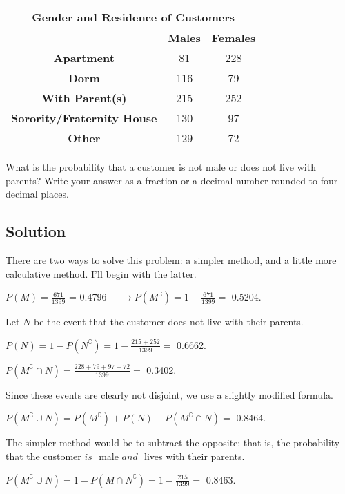 \documentclass[]{article}
\begin{document}
\begin{center}
\begin{tabular}{ | c | c | c | }
 \hline
 \multicolumn{3}{|c|}{\textbf{Gender and Residence of Customers}} \\
 \hline
  & \textbf{Males} & \textbf{Females}\\
 \hline
 \textbf{Apartment} & 81 & 228\\
 \hline
 \textbf{Dorm} & 116 & 79\\
 \hline
 \textbf{With Parent(s)} & 215 & 252\\
 \hline
 \textbf{Sorority/Fraternity House} & 130 & 97\\
 \hline
 \textbf{Other} & 129 & 72\\
 \hline
\end{tabular}
\end{center}

What is the probability that a customer is not male or does not live
with parents? Write your answer as a fraction or a decimal number
rounded to four decimal places.

\subsection{Solution}\label{solution-2}

There are two ways to solve this problem: a simpler method, and a little
more calculative method. I'll begin with the latter.

\(P(M) = \frac{671}{1399}\) = 0.4796
~~\(\to P(M^{\complement}) = 1 - \frac{671}{1399} =\) 0.5204.

Let \(N\) be the event that the customer does not live with their
parents.

\(P(N) = 1 - P(N^{\complement}) = 1 - \frac{215 + 252}{1399} =\) 0.6662.

\(P(M^{\complement} \cap N) = \frac{228 + 79 + 97 + 72}{1399} =\)
0.3402.

Since these events are clearly not disjoint, we use a slightly modified
formula.

\(P(M^{\complement} \cup N) = P(M^{\complement}) + P(N) - P(M^{\complement} \cap N) =\)
0.8464.

The simpler method would be to subtract the opposite; that is, the
probability that the customer \(\textit{is }\) male \(\textit{and }\)
lives with their parents.

\(P(M^{\complement} \cup N) = 1 - P(M \cap N^{\complement}) = 1 - \frac{215}{1399} =\)
0.8463.
\end{document}
